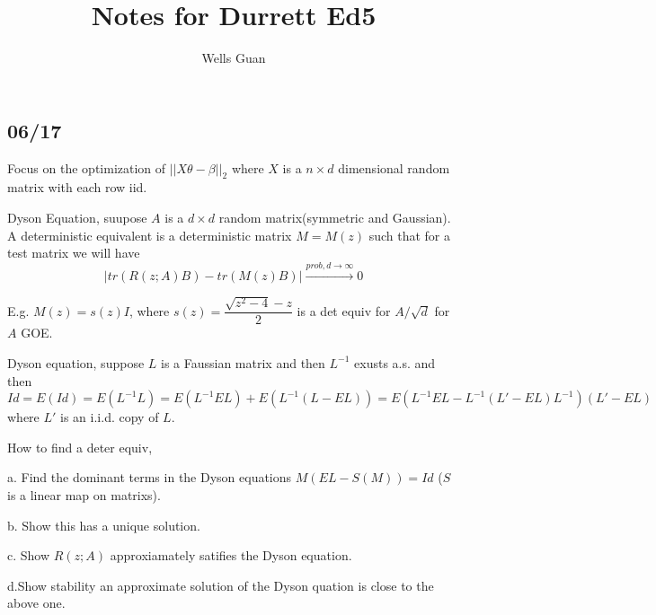 \documentclass[lang=en, color=blue, ]{elegantbook}
\title{Notes for Durrett Ed5}
\author{Wells Guan}
\begin{document}

\chapter{}

\section{06/17}

Focus on the optimization of $||X\theta - \beta||_2$ where $X$ is a $n\times d$ dimensional random matrix with each row iid. \par

Dyson Equation, suupose $A$ is a $d\times d$ random matrix(symmetric and Gaussian). A deterministic equivalent is a deterministic matrix $M=M(z)$ such that for a test matrix we will have
\[
|tr(R(z;A)B) - tr(M(z)B)| \overset{prob,d\to\infty}{\rightarrow} 0
\]\par

E.g. $M(z) = s(z)I$, where $s(z) = \dfrac{\sqrt{z^2-4}-z}{2}$ is a det equiv for $A/\sqrt{d}$ for $A$ GOE.\par

Dyson equation, suppose $L$ is a Faussian matrix and then $L^{-1}$ exusts a.s. and then
\[
Id = E(Id) = E(L^{-1}L) = E(L^{-1}EL) + E(L^{-1}(L-EL)) = E(L^{-1}EL - L^{-1}(L'-EL)L^{-1})(L'-EL)
\]
where $L'$ is an i.i.d. copy of $L$.\par

How to find a deter equiv, \par a. Find the dominant terms in the Dyson equations $M(EL- S(M)) = Id$ ($S$ is a linear map on matrixs). \par b. Show this has a unique solution.\par c. Show $R(z;A)$ approxiamately satifies the Dyson equation.\par d.Show stability an approximate solution of the Dyson quation is close to the above one.
\end{document}
